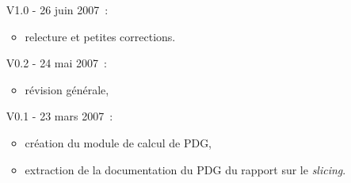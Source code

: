 \begin{small}
\begin{enumerate}
\begin{itemize}
    \end{itemize}
  \item[V1.0 - ] 26 juin 2007~:
    \begin{itemize}
      \item relecture et petites corrections.
    \end{itemize}
  \item[V0.2 - ] 24 mai 2007~:
    \begin{itemize}
      \item révision générale,
    \end{itemize}
  \item[V0.1 - ] 23 mars 2007~:
    \begin{itemize}
      \item création du module de calcul de PDG,
      \item extraction de la documentation du PDG du rapport sur le {\it
	slicing}.
    \end{itemize}
\end{enumerate}
\end{small}
\cleardoublepage
\tableofcontents
\cleardoublepage
\cleardoublepage
\cleardoublepage
\cleardoublepage
\cleardoublepage
\cleardoublepage
\cleardoublepage
\appendix
\cleardoublepage 
\cleardoublepage


\cleardoublepage
\printindex
